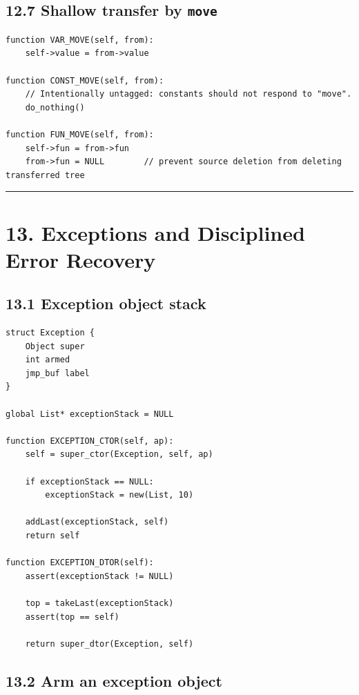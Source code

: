 \documentclass[11pt]{article}
\begin{document}
\subsection{\texorpdfstring{12.7 Shallow transfer by
\texttt{move}}{12.7 Shallow transfer by move}}\label{shallow-transfer-by-move}

\begin{verbatim}
function VAR_MOVE(self, from):
    self->value = from->value

function CONST_MOVE(self, from):
    // Intentionally untagged: constants should not respond to "move".
    do_nothing()

function FUN_MOVE(self, from):
    self->fun = from->fun
    from->fun = NULL        // prevent source deletion from deleting transferred tree
\end{verbatim}

\begin{center}\rule{0.5\linewidth}{0.5pt}\end{center}

\section{13. Exceptions and Disciplined Error
Recovery}\label{exceptions-and-disciplined-error-recovery}

\subsection{13.1 Exception object stack}\label{exception-object-stack}

\begin{verbatim}
struct Exception {
    Object super
    int armed
    jmp_buf label
}

global List* exceptionStack = NULL

function EXCEPTION_CTOR(self, ap):
    self = super_ctor(Exception, self, ap)

    if exceptionStack == NULL:
        exceptionStack = new(List, 10)

    addLast(exceptionStack, self)
    return self

function EXCEPTION_DTOR(self):
    assert(exceptionStack != NULL)

    top = takeLast(exceptionStack)
    assert(top == self)

    return super_dtor(Exception, self)
\end{verbatim}

\subsection{13.2 Arm an exception object}\label{arm-an-exception-object}
\end{document}
